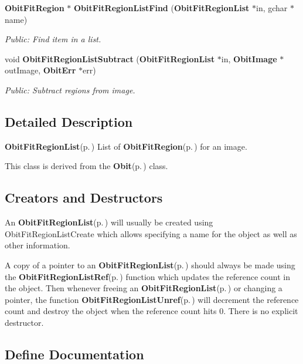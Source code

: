 \begin{CompactItemize}
{\bf Obit\-Fit\-Region} $\ast$ {\bf Obit\-Fit\-Region\-List\-Find} ({\bf Obit\-Fit\-Region\-List} $\ast$in, gchar $\ast$name)
\begin{CompactList}\small\item\em Public: Find item in a list. \item\end{CompactList}\item 
void {\bf Obit\-Fit\-Region\-List\-Subtract} ({\bf Obit\-Fit\-Region\-List} $\ast$in, {\bf Obit\-Image} $\ast$out\-Image, {\bf Obit\-Err} $\ast$err)
\begin{CompactList}\small\item\em Public: Subtract regions from image. \item\end{CompactList}\end{CompactItemize}


\subsection{Detailed Description}
{\bf Obit\-Fit\-Region\-List}{\rm (p.\,\pageref{structObitFitRegionList})} List of {\bf Obit\-Fit\-Region}{\rm (p.\,\pageref{structObitFitRegion})} for an image. 

This class is derived from the {\bf Obit}{\rm (p.\,\pageref{structObit})} class.\subsection{Creators and Destructors}\label{ObitFitRegionList_8h_ObitFitRegionListaccess}
An {\bf Obit\-Fit\-Region\-List}{\rm (p.\,\pageref{structObitFitRegionList})} will usually be created using Obit\-Fit\-Region\-List\-Create which allows specifying a name for the object as well as other information.

A copy of a pointer to an {\bf Obit\-Fit\-Region\-List}{\rm (p.\,\pageref{structObitFitRegionList})} should always be made using the {\bf Obit\-Fit\-Region\-List\-Ref}{\rm (p.\,\pageref{ObitFitRegionList_8h_a1})} function which updates the reference count in the object. Then whenever freeing an {\bf Obit\-Fit\-Region\-List}{\rm (p.\,\pageref{structObitFitRegionList})} or changing a pointer, the function {\bf Obit\-Fit\-Region\-List\-Unref}{\rm (p.\,\pageref{ObitFitRegionList_8h_a0})} will decrement the reference count and destroy the object when the reference count hits 0. There is no explicit destructor.

\subsection{Define Documentation}
